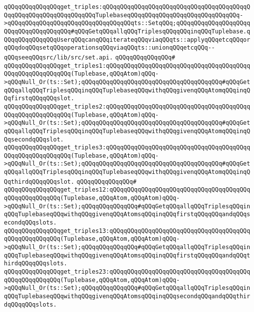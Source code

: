 \verb|qQQqqQQqqQQqqQQqget_triples:qQQqqQQqqQQqqQQqqQQqqQQqqQQqqQQqqQQqqQQqqQQqqQQqqQQqqQQqqQQqqQQqqQQqTuplebaseqQQqqQQqqQQqqQQqqQQqqQQqqQQqqQQq->qQQqqQQqqQQqqQQqqQQqqQQqqQQqqQQqqQQqts::SetqQQq;qQQqqQQqqQQqqQQqqQQqqQQqqQQqqQQqqQQqqQQq#qQQqGetqQQqallqQQqTriplesqQQqqQQqinqQQqTuplebase.qQQqqQQqqQQqqQQqUserqQQqcanqQQqiterateqQQqviaqQQqts::applyqQQqetcqQQqorqQQqdoqQQqsetqQQqoperationsqQQqviaqQQqts::unionqQQqetcqQQq--qQQqseeqQQqsrc/lib/src/set.api.|\newline
\verb|qQQqqQQqqQQqqQQq#|\newline
\verb|qQQqqQQqqQQqqQQqget_triples1:qQQqqQQqqQQqqQQqqQQqqQQqqQQqqQQqqQQqqQQqqQQqqQQqqQQqqQQqqQQq(Tuplebase,qQQqAtom)qQQq->qQQqNull_Or(ts::Set);qQQqqQQqqQQqqQQqqQQqqQQqqQQqqQQqqQQqqQQq#qQQqGetqQQqallqQQqTriplesqQQqinqQQqTuplebaseqQQqwithqQQqgivenqQQqAtomqQQqinqQQqfirstqQQqqQQqslot.|\newline
\verb|qQQqqQQqqQQqqQQqget_triples2:qQQqqQQqqQQqqQQqqQQqqQQqqQQqqQQqqQQqqQQqqQQqqQQqqQQqqQQqqQQq(Tuplebase,qQQqAtom)qQQq->qQQqNull_Or(ts::Set);qQQqqQQqqQQqqQQqqQQqqQQqqQQqqQQqqQQqqQQq#qQQqGetqQQqallqQQqTriplesqQQqinqQQqTuplebaseqQQqwithqQQqgivenqQQqAtomqQQqinqQQqsecondqQQqslot.|\newline
\verb|qQQqqQQqqQQqqQQqget_triples3:qQQqqQQqqQQqqQQqqQQqqQQqqQQqqQQqqQQqqQQqqQQqqQQqqQQqqQQqqQQq(Tuplebase,qQQqAtom)qQQq->qQQqNull_Or(ts::Set);qQQqqQQqqQQqqQQqqQQqqQQqqQQqqQQqqQQqqQQq#qQQqGetqQQqallqQQqTriplesqQQqinqQQqTuplebaseqQQqwithqQQqgivenqQQqAtomqQQqinqQQqthirdqQQqqQQqslot.|\newline
\verb|qQQqqQQqqQQqqQQq#|\newline
\verb|qQQqqQQqqQQqqQQqget_triples12:qQQqqQQqqQQqqQQqqQQqqQQqqQQqqQQqqQQqqQQqqQQqqQQqqQQqqQQq(Tuplebase,qQQqAtom,qQQqAtom)qQQq->qQQqNull_Or(ts::Set);qQQqqQQqqQQqqQQq#qQQqGetqQQqallqQQqTriplesqQQqinqQQqTuplebaseqQQqwithqQQqgivenqQQqAtomsqQQqinqQQqfirstqQQqqQQqandqQQqsecondqQQqslots.|\newline
\verb|qQQqqQQqqQQqqQQqget_triples13:qQQqqQQqqQQqqQQqqQQqqQQqqQQqqQQqqQQqqQQqqQQqqQQqqQQqqQQq(Tuplebase,qQQqAtom,qQQqAtom)qQQq->qQQqNull_Or(ts::Set);qQQqqQQqqQQqqQQq#qQQqGetqQQqallqQQqTriplesqQQqinqQQqTuplebaseqQQqwithqQQqgivenqQQqAtomsqQQqinqQQqfirstqQQqqQQqandqQQqthirdqQQqqQQqslots.|\newline
\verb|qQQqqQQqqQQqqQQqget_triples23:qQQqqQQqqQQqqQQqqQQqqQQqqQQqqQQqqQQqqQQqqQQqqQQqqQQqqQQq(Tuplebase,qQQqAtom,qQQqAtom)qQQq->qQQqNull_Or(ts::Set);qQQqqQQqqQQqqQQq#qQQqGetqQQqallqQQqTriplesqQQqinqQQqTuplebaseqQQqwithqQQqgivenqQQqAtomsqQQqinqQQqsecondqQQqandqQQqthirdqQQqqQQqslots.|\newline
